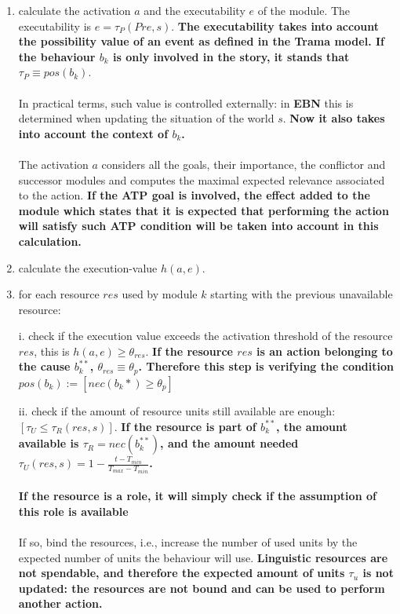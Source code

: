 \documentclass[
		twoside,openright,titlepage,numbers=noenddot,manychapters,
		headinclude,%
                footinclude=false,cleardoublepage=empty,
                BCOR=5mm,
		fontsize=11pt, %
                 enabledeprecatedfontcommands]{scrreprt}
\begin{document}
\begin{enumerate}
  \item calculate the activation $a$ and the executability $e$ of the module. The executability is $e=\tau_P(Pre,s)$. \textbf{The executability takes into account the possibility value of an event as defined in the \textbf{Trama} model. If the behaviour $b_k$ is only involved in the story, it stands that  $\tau_P\equiv pos(b_k)$}. \\
\\
In practical terms, such value is controlled externally:  in \textbf{EBN} this is determined when updating the situation of the world $s$. \textbf{Now it also takes into account the context of $b_k$.} \\
\\
The activation $a$ considers all the goals, their importance, the conflictor and successor modules and computes the maximal expected relevance associated to the action. \textbf{If the \textbf{ATP} goal is involved, the effect added to the module which states that it is expected that performing the action will satisfy such \textbf{ATP} condition will be taken into account in this calculation.}

  \item calculate the execution-value $h(a,e)$. 
  \item for each resource $res$ used by module $k$ starting with the previous unavailable resource:

i.	check if the execution value exceeds the activation threshold of the resource $res$, this is $h(a,e) \geq \theta_{res}$. \textbf{If the resource $res$ is an action belonging to the cause $b_k^{**}$, $ \theta_{res} \equiv \theta_p$. Therefore this step is verifying the condition $pos(b_k):=[nec(b_k*) \geq \theta_p]$ }

ii.	check if the amount of resource units still available are enough: $[\tau_U \leq \tau_R(res,s)]$. \textbf{If the resource is part of $b_k^{**}$,  the amount available is $\tau_R=nec(b_k^{**})$, and the amount needed $\tau_U(res,s)=1-\frac{t-T_{min}}{T_{max}-T_{min}}$. }\\
\\
\textbf{If the resource is a role, it will simply check if the assumption of this role is available}\\
\\
If so, bind the resources, i.e., increase the number of used units by the expected number of units the behaviour will use. \textbf{Linguistic resources are not spendable, and therefore the expected amount of units $\tau_u$ is not updated: the resources are not bound and can be used to perform another action. }


\end{enumerate}
\end{document}
